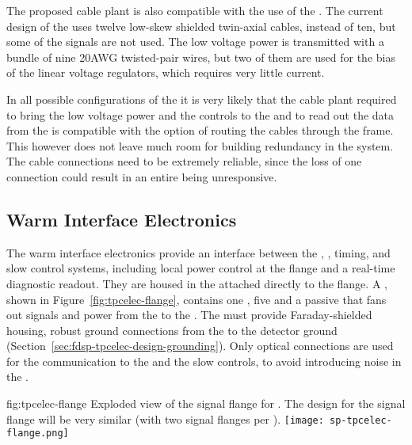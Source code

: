 The proposed cable plant is also compatible with the use of the 
. The current design of the   uses 
twelve low-skew shielded twin-axial cables, instead of ten, but some of
the signals are not used. The low voltage power is transmitted with a 
bundle of nine \num{20}{AWG} twisted-pair wires, but two of them are
used for the bias of the linear voltage regulators, which requires very
little current.

In all possible configurations of the  it is very likely that
the cable plant required to bring the low voltage power and the controls
to the  and to read out the data from the  is
compatible with the option of routing the cables through the 
frame. This however does not leave much room for building redundancy in
the system. The cable connections need to be extremely reliable, since
the loss of one connection could result in an entire  being
unresponsive.

\subsection{Warm Interface Electronics}
\label{sec:fdsp-tpcelec-design-warm}

The warm interface electronics provide an interface between the 
, , timing, and slow control systems, including 
local power control at the flange and a real-time diagnostic readout. 
They are housed in the  attached directly to the  
flange.  %
A , shown in Figure~\ref{fig:tpcelec-flange}, 
contains one , %
 five %
 and a passive 
that fans out signals and  power from the  to the 
. The  must provide Faraday-shielded housing, 
robust ground connections from the  to the detector ground 
(Section~\ref{sec:fdsp-tpcelec-design-grounding}). Only optical
connections are used for the communication to the  and the
slow controls, to avoid introducing noise in the  \fdth.

\begin{dunefigure}
{fig:tpcelec-flange}
{Exploded view of the  signal flange for .  
The design for the   
signal flange will be very similar (with two  signal flanges per \fdth).}
\texttt{[image: sp-tpcelec-flange.png]}
\end{dunefigure}

